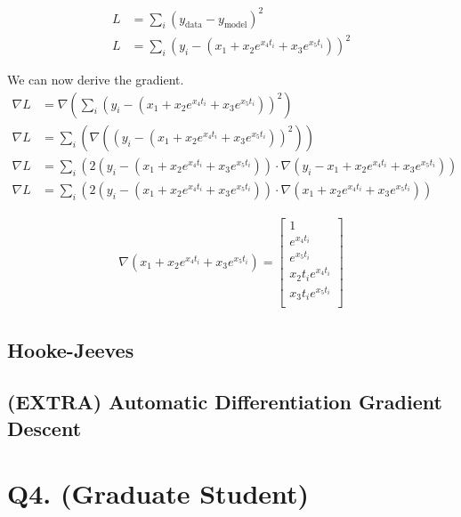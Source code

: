 \documentclass{article}
\begin{document}
    \begin{align}
    L &= \sum_i (y_{\text{data}} - y_{\text{model}})^2 \\
    L &= \sum_i (y_{i} - (x_1 + x_2 e ^ {x_4 t_i} + x_3 e ^{x_5 t_i}))^2
    \end{align}

    We can now derive the gradient.
    \begin{align}
    \nabla L &= \nabla \left( \sum_i (y_{i} - (x_1 + x_2 e ^ {x_4 t_i} + x_3 e ^{x_5 t_i}))^2 \right) \\
    \nabla L &= \sum_i \left( \nabla \left( (y_{i} - (x_1 + x_2 e ^ {x_4 t_i} + x_3 e ^{x_5 t_i}))^2 \right) \right) \\
    \nabla L &= \sum_i \left( 2(y_{i} - (x_1 + x_2 e ^ {x_4 t_i} + x_3 e ^{x_5 t_i})) \cdot \nabla (y_{i} - x_1 + x_2 e ^ {x_4 t_i} + x_3 e ^{x_5 t_i}) \right) \\
    \nabla L &= \sum_i \left( 2(y_{i} - (x_1 + x_2 e ^ {x_4 t_i} + x_3 e ^{x_5 t_i})) \cdot \nabla (x_1 + x_2 e ^ {x_4 t_i} + x_3 e ^{x_5 t_i}) \right)
    \end{align}

    \begin{align}
        \nabla (x_1 + x_2 e ^ {x_4 t_i} + x_3 e ^{x_5 t_i}) = 
            \begin{bmatrix}
                1 \\
                e ^ {x_4 t_i} \\
                e ^ {x_5 t_i} \\
                x_2 t_i e ^ {x_4 t_i} \\
                x_3 t_i e ^{x_5 t_i} \\
            \end{bmatrix}
    \end{align}

    \subsection{Hooke-Jeeves}

    \subsection{(EXTRA) Automatic Differentiation Gradient Descent}

    \section{Q4. (Graduate Student)}
\end{document}
